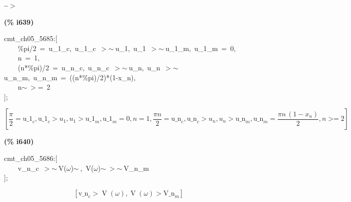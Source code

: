 \documentclass[fleqn]{article}
\begin{document}
\noindent
\begin{minipage}[t]{4.000000em}\color{red}\bfseries
 --\ensuremath{\ensuremath{>}}	
\end{minipage}
\begin{minipage}[t]{\textwidth}\color{blue}

\end{minipage}

\noindent%



\noindent
\begin{minipage}[t]{4.000000em}\color{red}\bfseries
(\% i639)	
\end{minipage}
\begin{minipage}[t]{\textwidth}\color{blue}
cmt\_ch05\_5685:[\\
\ \ \ \ \%pi/2\ =\ u\_1\_c,\ u\_1\_c\ \ensuremath{>}\ensuremath{\sim\ }u\_1,\ u\_1\ \ensuremath{>}\ensuremath{\sim\ }u\_1\_m,\ u\_1\_m\ =\ 0,\\
\ \ \ \ n\ =\ 1,\\
\ \ \ \ (n*\%pi)/2\ =\ u\_n\_c,\ u\_n\_c\ \ensuremath{>}\ensuremath{\sim\ }u\_n,\ u\_n\ \ensuremath{>}\ensuremath{\sim\ }u\_n\_m,\ u\_n\_m\ =\ ((n*\%pi)/2)*(1-x\_n),\\
\ \ \ \ n\ensuremath{\sim\ }\ensuremath{>}=\ 2\\
];
\end{minipage}
\[\displaystyle \tag{\% o639} 
\operatorname{[}\frac{\ensuremath{\pi} }{2}={{\ensuremath{\mathrm{u\_ 1}}}_c}\operatorname{,}{{\ensuremath{\mathrm{u\_ 1}}}_c}\operatorname{>  }{u_1}\operatorname{,}{u_1}\operatorname{>  }{{\ensuremath{\mathrm{u\_ 1}}}_m}\operatorname{,}{{\ensuremath{\mathrm{u\_ 1}}}_m}=0\operatorname{,}n=1\operatorname{,}\frac{\ensuremath{\pi}  n}{2}={{\ensuremath{\mathrm{u\_ n}}}_c}\operatorname{,}{{\ensuremath{\mathrm{u\_ n}}}_c}\operatorname{>  }{u_n}\operatorname{,}{u_n}\operatorname{>  }{{\ensuremath{\mathrm{u\_ n}}}_m}\operatorname{,
}{{\ensuremath{\mathrm{u\_ n}}}_m}=\frac{\ensuremath{\pi}  n\, \left( 1-{x_n}\right) }{2}\operatorname{,}n\operatorname{>  =}2\operatorname{]}\mbox{}
\]


\noindent
\begin{minipage}[t]{4.000000em}\color{red}\bfseries
(\% i640)	
\end{minipage}
\begin{minipage}[t]{\textwidth}\color{blue}
cmt\_ch05\_5686:[\\
\ \ \ \ v\_n\_c\ \ensuremath{>}\ensuremath{\sim\ }V(\ensuremath{\omega})\ensuremath{\sim\ },\ V(\ensuremath{\omega})\ensuremath{\sim\ }\ensuremath{>}\ensuremath{\sim\ }V\_n\_m\\
];
\end{minipage}
\[\displaystyle \tag{\% o640} 
\left[ {{\ensuremath{\mathrm{v\_ n}}}_c}\operatorname{>  }\operatorname{V}\left( \omega \right) \operatorname{,}\operatorname{V}\left( \omega \right) \operatorname{>  }{{\ensuremath{\mathrm{V\_ n}}}_m}\right] \mbox{}
\]
\end{document}
